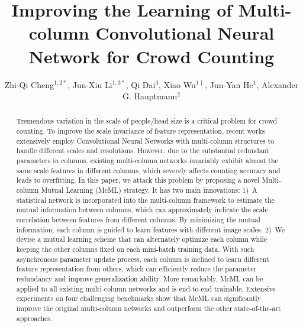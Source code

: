 \documentclass[sigconf]{acmart}
\newcommand{\czq}[1]{\textcolor{black}{#1}}
\newcommand{\ljxa}[1]{\textcolor{black}{#1}}
\begin{document}
\fancyhead{} 


\title[]{Improving the Learning of Multi-column Convolutional Neural Network for Crowd Counting}
    

\author{Zhi-Qi Cheng$^{1,2*}$, Jun-Xiu Li$^{1,3*}$, Qi Dai$^3$, Xiao Wu$^{1\dagger}$, Jun-Yan He$^1$, Alexander G. Hauptmann$^2$}

\renewcommand{\shortauthors}{Zhi-Qi Cheng et al.}

\begin{abstract}
\label{sec:abstract}
Tremendous variation in the scale of people/head size is a critical problem for crowd counting.
To improve the scale invariance of feature representation, recent works extensively employ Convolutional Neural Networks with multi-column structures to handle different scales and resolutions.
However, due to the substantial redundant parameters in columns, \czq{existing} multi-column networks invariably exhibit almost the same scale features \czq{in different columns}, which severely affects counting accuracy and leads to overfitting.
In this paper, we attack this problem by proposing a novel Multi-column Mutual Learning (McML) strategy.
It has two main innovations:
1)~A statistical network is incorporated into the multi-column framework to estimate the mutual information between columns, which can \czq{approximately} indicate \czq{the scale correlation} between features from different columns.
By minimizing the mutual information, each column is guided to learn \ljxa{features} with different \czq{image scales}.
2)~We devise a mutual learning scheme that \czq{can alternately optimize each column} while keeping the other columns fixed \czq{on each mini-batch training data}.
With such asynchronous \czq{parameter update process}, each column is inclined to learn different feature representation from others, which can efficiently reduce the parameter redundancy and \czq{improve generalization ability}.
More remarkably, McML can be applied to all existing multi-column networks and is end-to-end trainable.
Extensive experiments on four challenging benchmarks show that McML can significantly improve the original multi-column networks and outperform the other state-of-the-art approaches.
\end{abstract}


\end{document}
